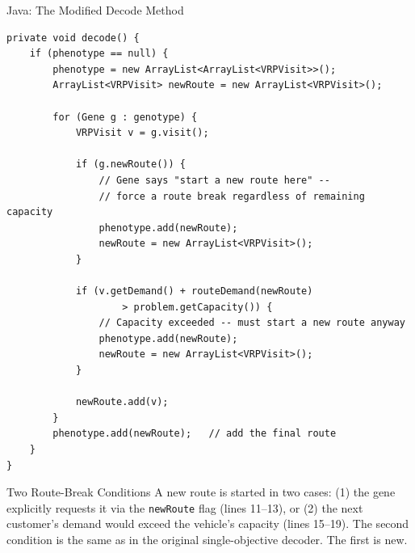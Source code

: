 \documentclass[aspectratio=169,10pt]{beamer}
\begin{document}
\begin{frame}[fragile]{Java: The Modified Decode Method}
\begin{lstlisting}[language=JavaBook]
private void decode() {
    if (phenotype == null) {
        phenotype = new ArrayList<ArrayList<VRPVisit>>();
        ArrayList<VRPVisit> newRoute = new ArrayList<VRPVisit>();

        for (Gene g : genotype) {
            VRPVisit v = g.visit();

            if (g.newRoute()) {
                // Gene says "start a new route here" --
                // force a route break regardless of remaining capacity
                phenotype.add(newRoute);
                newRoute = new ArrayList<VRPVisit>();
            }

            if (v.getDemand() + routeDemand(newRoute)
                    > problem.getCapacity()) {
                // Capacity exceeded -- must start a new route anyway
                phenotype.add(newRoute);
                newRoute = new ArrayList<VRPVisit>();
            }

            newRoute.add(v);
        }
        phenotype.add(newRoute);   // add the final route
    }
}
\end{lstlisting}
\begin{alertblock}{Two Route-Break Conditions}
  A new route is started in two cases: (1) the gene explicitly requests it via
  the \texttt{newRoute} flag (lines 11--13), or (2) the next customer's demand
  would exceed the vehicle's capacity (lines 15--19).  The second condition is
  the same as in the original single-objective decoder.  The first is new.
\end{alertblock}
\end{frame}
\end{document}
